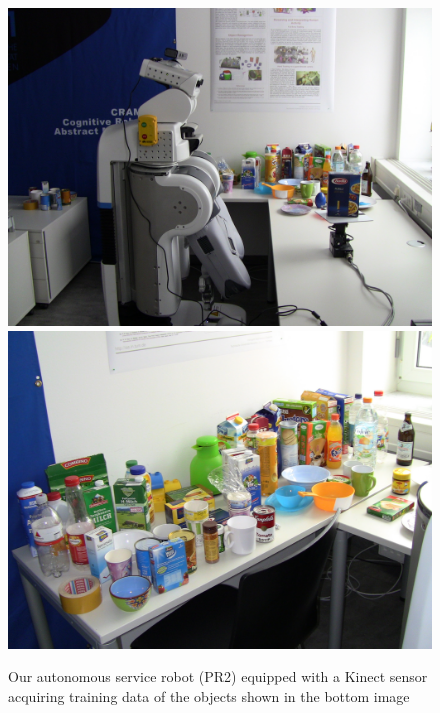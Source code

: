 \documentclass[conference]{sty/IEEEtran}
\begin{document}
\begin{figure}[htb!]
  \begin{center}
    \includegraphics[width=.9\columnwidth]{figures/objects/pr2_rot_table.jpg}
    \includegraphics[width=.9\columnwidth]{figures/objects/objects.jpg}
    \caption{Our autonomous service robot (PR2) equipped with a Kinect sensor
    acquiring training data of the objects shown in the bottom image}
    \label{fig:robot}
  \end{center}
\end{figure}

\end{document}
